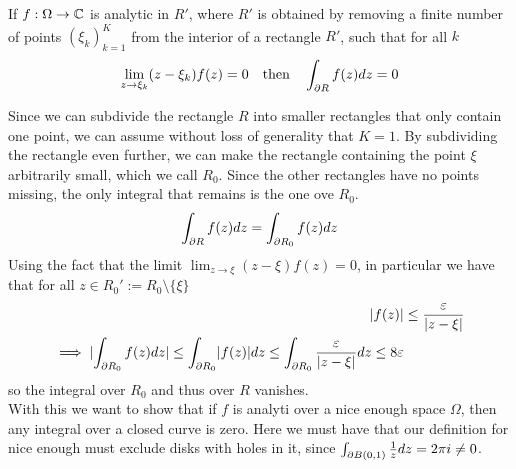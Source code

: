 \begin{corollary}[]
	If $f: \Omega \to \mathbb{C}$ is analytic in $R'$, where $R'$ is obtained by removing a finite number of points $\left(\xi_{k}\right)_{k =1}^{K}$ from the interior of a rectangle $R'$, such that for all $k$ 
	\begin{align*}
		\lim_{z \to \xi_k}(z - \xi_k)f(z) = 0	\quad \text{then} \quad \int_{\partial R} f(z) dz = 0
	\end{align*}
\end{corollary}

Since we can subdivide the rectangle $R$ into smaller rectangles that only contain one point, we can assume without loss of generality that $K = 1$. By subdividing the rectangle even further, we can make the rectangle containing the point $\xi$ arbitrarily small, which we call $R_0$. Since the other rectangles have no points missing, the only integral that remains is the one ove $R_0$.
\begin{align*}
	\int_{\partial R}f(z) dz = \int_{\partial R_0}f(z) dz	
\end{align*}
Using the fact that the limit $\lim_{z \to \xi}(z - \xi)f(z) = 0$, in particular we have that for all $z \in R_0' := R_0 \setminus \{\xi\}$
\begin{align*}
	\abs{f(z)} &\leq \frac{\epsilon}{\abs{z - \xi}}\\
	\implies \abs{\int_{\del R_0} f(z) dz} \leq \int_{\del R_0} \abs{f(z)} dz \leq \int_{\del R_0} \frac{\epsilon}{\abs{z - \xi}}dz \leq 8 \epsilon
\end{align*}
so the integral over $R_0$ and thus over $R$ vanishes.\\


With this we want to show that if $f$ is analyti over a nice enough space $\Omega$, then any integral over a closed curve is zero. Here we must have that our definition for nice enough must exclude disks with holes in it, since $\int_{\partial B(0,1)}\frac{1}{z}dz = 2 \pi i \neq 0$.

